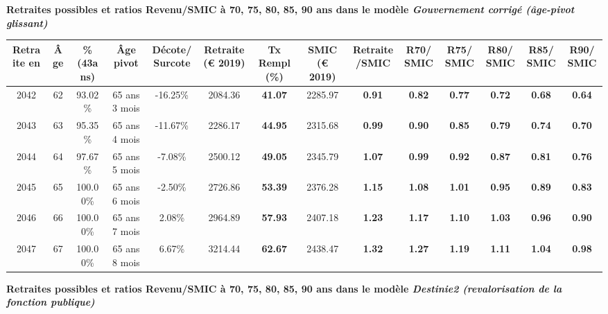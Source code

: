  \vspace{0.1cm} 
{\bf \noindent Retraites possibles et ratios Revenu/SMIC à 70, 75, 80, 85, 90 ans dans le modèle \emph{Gouvernement corrigé (âge-pivot glissant)}}  
 
\begin{adjustbox}{max width=\textwidth} 
\begin{tabular}[htb]{|c|c||c|c|c||c|c||c|c||c|c|c|c|c|} 
\hline 
 Retraite en &  Âge &  \%(43ans) &  Âge pivot &  Décote/Surcote &  Retraite (\euro{} 2019) &  Tx Rempl(\%) &  SMIC (\euro{} 2019) &  Retraite/SMIC &  R70/SMIC &  R75/SMIC &  R80/SMIC &  R85/SMIC &  R90/SMIC \\ 
\hline \hline 
 2042 &  62 &  93.02\% &  65 ans 3 mois &  -16.25\% &  2084.36 &  {\bf 41.07} &  2285.97 &  {\bf {\color{red} 0.91}} &  {\bf {\color{red} 0.82}} &  {\bf {\color{red} 0.77}} &  {\bf {\color{red} 0.72}} &  {\bf {\color{red} 0.68}} &  {\bf {\color{red} 0.64}} \\ 
\hline 
 2043 &  63 &  95.35\% &  65 ans 4 mois &  -11.67\% &  2286.17 &  {\bf 44.95} &  2315.68 &  {\bf {\color{red} 0.99}} &  {\bf {\color{red} 0.90}} &  {\bf {\color{red} 0.85}} &  {\bf {\color{red} 0.79}} &  {\bf {\color{red} 0.74}} &  {\bf {\color{red} 0.70}} \\ 
\hline 
 2044 &  64 &  97.67\% &  65 ans 5 mois &  -7.08\% &  2500.12 &  {\bf 49.05} &  2345.79 &  {\bf 1.07} &  {\bf {\color{red} 0.99}} &  {\bf {\color{red} 0.92}} &  {\bf {\color{red} 0.87}} &  {\bf {\color{red} 0.81}} &  {\bf {\color{red} 0.76}} \\ 
\hline 
 2045 &  65 &  100.00\% &  65 ans 6 mois &  -2.50\% &  2726.86 &  {\bf 53.39} &  2376.28 &  {\bf 1.15} &  {\bf 1.08} &  {\bf 1.01} &  {\bf {\color{red} 0.95}} &  {\bf {\color{red} 0.89}} &  {\bf {\color{red} 0.83}} \\ 
\hline 
 2046 &  66 &  100.00\% &  65 ans 7 mois &  2.08\% &  2964.89 &  {\bf 57.93} &  2407.18 &  {\bf 1.23} &  {\bf 1.17} &  {\bf 1.10} &  {\bf 1.03} &  {\bf {\color{red} 0.96}} &  {\bf {\color{red} 0.90}} \\ 
\hline 
 2047 &  67 &  100.00\% &  65 ans 8 mois &  6.67\% &  3214.44 &  {\bf 62.67} &  2438.47 &  {\bf 1.32} &  {\bf 1.27} &  {\bf 1.19} &  {\bf 1.11} &  {\bf 1.04} &  {\bf {\color{red} 0.98}} \\ 
\hline 
\hline 
\end{tabular} 
\end{adjustbox} 
 
 \vspace{0.1cm} 
{\bf \noindent Retraites possibles et ratios Revenu/SMIC à 70, 75, 80, 85, 90 ans dans le modèle \emph{Destinie2 (revalorisation de la fonction publique)}}  
 
